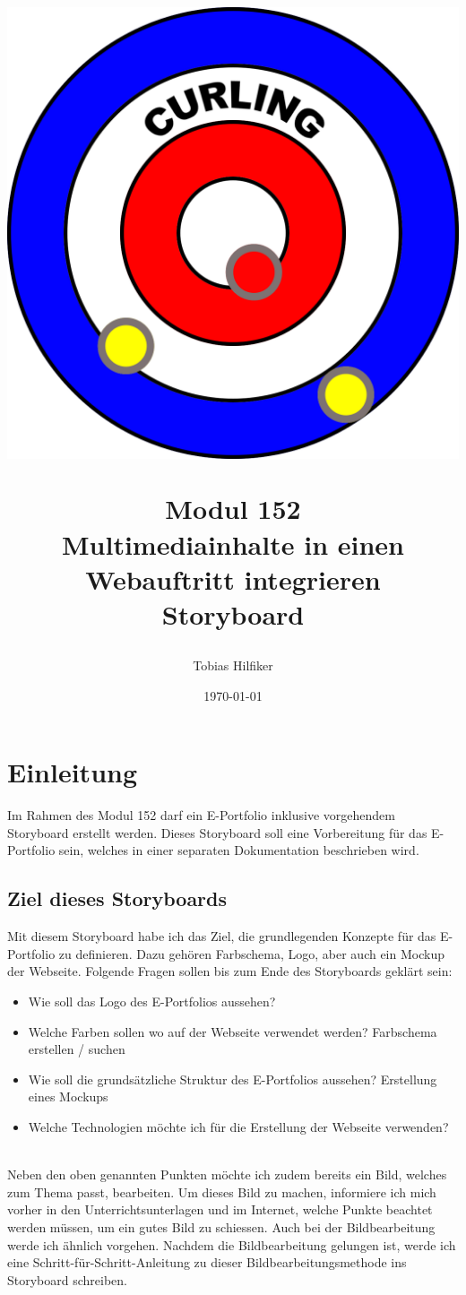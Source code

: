 \documentclass[11pt]{article}
\title{
    \includegraphics[width=\textwidth]{media/curling_logo}
    \begin{center}
        Modul 152 \\
        Multimediainhalte in einen Webauftritt integrieren\\
        Storyboard
    \end{center}}
\author{Tobias Hilfiker}
\date{\today}
\begin{document}
    \begin{titlingpage}
        \maketitle
    \end{titlingpage}
    \pagebreak

    \tableofcontents
    \pagebreak

    \section{Einleitung}
    Im Rahmen des Modul 152 darf ein E-Portfolio inklusive vorgehendem Storyboard erstellt werden.
    Dieses Storyboard soll eine Vorbereitung für das E-Portfolio sein, welches in einer separaten
    Dokumentation beschrieben wird.

    \subsection{Ziel dieses Storyboards}
    Mit diesem Storyboard habe ich das Ziel, die grundlegenden Konzepte für das E-Portfolio zu definieren.
    Dazu gehören Farbschema, Logo, aber auch ein Mockup der Webseite.
    Folgende Fragen sollen bis zum Ende des Storyboards geklärt sein:
    \begin{itemize}
        \item Wie soll das Logo des E-Portfolios aussehen?
        \item Welche Farben sollen wo auf der Webseite verwendet werden? \textrightarrow Farbschema erstellen / suchen
        \item Wie soll die grundsätzliche Struktur des E-Portfolios aussehen?
        \textrightarrow Erstellung eines Mockups
        \item Welche Technologien möchte ich für die Erstellung der Webseite verwenden?
    \end{itemize}
    \\
    Neben den oben genannten Punkten möchte ich zudem bereits ein Bild, welches zum Thema passt, bearbeiten.
    Um dieses Bild zu machen, informiere ich mich vorher in den Unterrichtsunterlagen und im Internet, welche
    Punkte beachtet werden müssen, um ein gutes Bild zu schiessen.
    Auch bei der Bildbearbeitung werde ich ähnlich vorgehen. Nachdem die Bildbearbeitung gelungen ist, werde
    ich eine Schritt-für-Schritt-Anleitung zu dieser Bildbearbeitungsmethode ins Storyboard schreiben.
\end{document}
